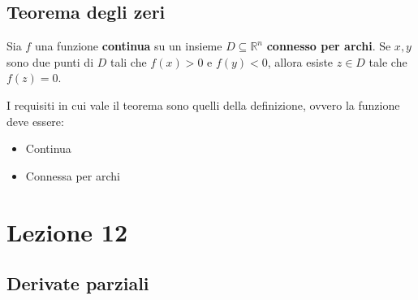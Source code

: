 \documentclass[a4paper]{article}
\begin{document}
	\newpage
	
	\subsection{Teorema degli zeri}
	
	Sia $f$ una funzione \textbf{continua} su un insieme $D \subseteq \mathbb{R}^{n}$ \textbf{connesso per archi}.\newline
	Se $x,y$ sono due punti di $D$ tali che $f\left(x\right) > 0$ e $f\left(y\right) < 0$, allora esiste $z \in D$ tale che $f\left(z\right) = 0$.\newline
	
	\noindent
	I requisiti in cui vale il teorema sono quelli della definizione, ovvero la funzione deve essere:
	
	\begin{itemize}
		\item Continua
		\item Connessa per archi
	\end{itemize}

	\newpage
	
	\section{Lezione 12}
	
	\subsection{Derivate parziali}
\end{document}
